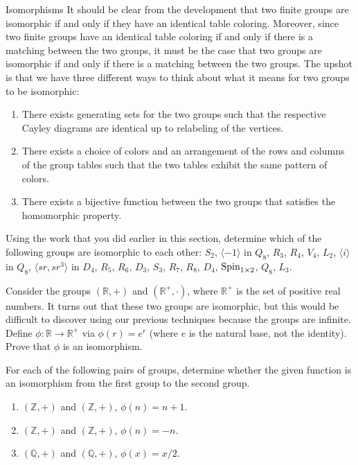 \begin{section}{Isomorphisms}
It should be clear from the development that two finite groups are isomorphic if and only if they have an identical table coloring.  Moreover, since two finite groups have an identical table coloring if and only if there is a matching between the two groups, it must be the case that two groups are isomorphic if and only if there is a matching between the two groups.  The upshot is that we have three different ways to think about what it means for two groups to be isomorphic:
\begin{enumerate}[label=\textrm{(\arabic*)}]
\item There exists generating sets for the two groups such that the respective Cayley diagrams are identical up to relabeling of the vertices.
\item There exists a choice of colors and an arrangement of the rows and columns of the group tables such that the two tables exhibit the same pattern of colors.
\item There exists a bijective function between the two groups that satisfies the homomorphic property.
\end{enumerate}

\begin{problem}
Using the work that you did earlier in this section, determine which of the following groups are isomorphic to each other: $S_2$, $\langle -1\rangle$ in $Q_8$, $R_3$, $R_4$, $V_4$, $L_2$, $\langle i\rangle$ in $Q_8$, $\langle sr, sr^3\rangle$ in $D_4$, $R_5$, $R_6$, $D_3$, $S_3$, $R_7$, $R_8$, $D_4$, $\operatorname{Spin}_{1\times 2}$, $Q_8$, $L_3$.
\end{problem}

\begin{problem}
Consider the groups $(\mathbb{R},+)$ and $(\mathbb{R}^+,\cdot)$, where $\mathbb{R}^+$ is the set of positive real numbers.  It turns out that these two groups are isomorphic, but this would be difficult to discover using our previous techniques because the groups are infinite.  Define $\phi:\mathbb{R}\to \mathbb{R}^+$ via $\phi(r)=e^r$ (where $e$ is the natural base, not the identity). Prove that $\phi$ is an isomorphism.
\end{problem}

\begin{problem}
For each of the following pairs of groups, determine whether the given function is an isomorphism from the first group to the second group.
\begin{enumerate}[label=\textrm{(\alph*)}]
\item $(\mathbb{Z},+)$ and $(\mathbb{Z},+)$, $\phi(n)=n+1$.
\item $(\mathbb{Z},+)$ and $(\mathbb{Z},+)$, $\phi(n)=-n$.
\item $(\mathbb{Q},+)$ and $(\mathbb{Q},+)$, $\phi(x)=x/2$.
\end{enumerate}
\end{problem}


\end{section}
